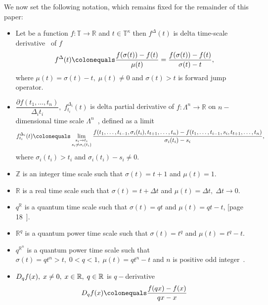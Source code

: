 We now set the following notation, which remains fixed for the remainder of this paper:
\begin{itemize}
    \item Let be a function $f\colon \mathbb{T} \to \mathbb{R}$ and $t\in\mathbb{T}^{\kappa}$ then $f^{\Delta}(t)$
    is delta time-scale derivative~\cite{Bohner2001DynamicEO} of $f$
    \[
        f^{\Delta} (t) \colonequals \frac{f(\sigma(t)) - f(t)}{\mu(t)} = \frac{f(\sigma(t)) - f(t)}{\sigma(t) - t},
    \]
    where $\mu(t) = \sigma(t) - t, \; \mu(t) \neq 0$ and $\sigma(t) > t$ is forward jump operator.

    \item $\dfrac{\partial f(t_1,\ldots,t_n)}{\Delta_i t_i}, \; f^{\Delta_i}_{t_i}(t)$ is delta partial derivative
    of $f\colon \Lambda^n \to \mathbb{R}$ on $n-$dimensional time scale
    $\Lambda^n$~\cite{bohner2004partial, ahlbrandt2002partial,JACKSON2006391},
    defined as a limit
    \[
        f^{\Delta_i}_{t_i}(t) \colonequals \lim \limits_{\substack{s_i \to t_i \\ s_i \neq \sigma_i(t_i)}}
        \frac{
            f(t_1, \ldots, t_{i-1}, \sigma_i(t_i), t_{t+1}, \ldots, t_n)
            - f(t_1, \ldots, t_{i-1}, s_i, t_{t+1}, \ldots, t_n)
        }{\sigma_i(t_i) - s_i},
    \]
    where $\sigma_i(t_i) > t_i$ and $\sigma_i(t_i) - s_i \neq 0$.

    \item $\mathbb{Z}$ is an integer time scale such that $\sigma(t) = t+1$ and $\mu(t) = 1$.

    \item $\mathbb{R}$ is a real time scale such that $\sigma(t) = t+\Delta t$ and $\mu(t) = \Delta t, \; \Delta t \to 0$.

    \item $q^\mathbb{R}$ is a quantum time scale such that $\sigma(t) = qt$ and $\mu(t) = qt - t$,
    [page 18~\cite{Bohner2001DynamicEO}].

    \item $\mathbb{R}^q$ is a quantum power time scale such that $\sigma(t) = t^q$ and $\mu(t) = t^q - t$.

    \item $q^{\mathbb{R}^n}$ is a quantum power time scale
    such that $\sigma(t) = qt^n > t, \; 0<q<1, \; \mu(t) = qt^n - t$ and $n$ is positive
    odd integer~\cite{aldwoah2011power}.

    \item $D_{q} f(x), \; x\neq 0, \; x\in\mathbb{R}, \; q\in\mathbb{R}$ is $q-$derivative~\cite{jackson_1909,ernst2000history,ernst2008different,kac2001quantum}
    \[
        \qderivative{f(x)} \colonequals \frac{f(qx)-f(x)}{qx-x}
    \]


\end{itemize}
